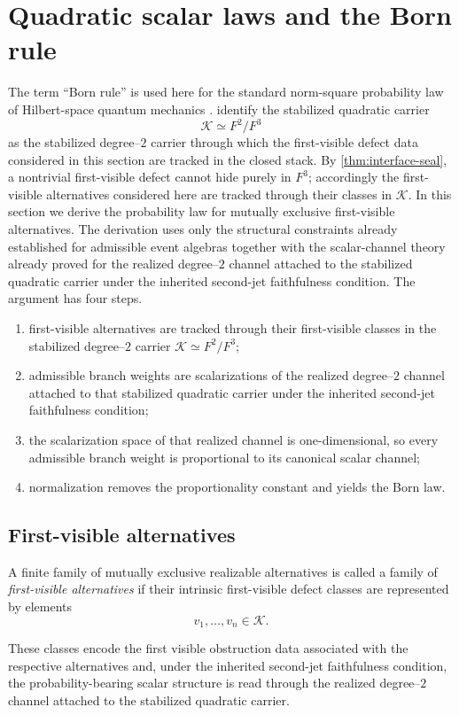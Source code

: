 \section{Quadratic scalar laws and the Born rule}
\label{sec:born-law}
The term ``Born rule'' is used here for the standard norm-square
probability law of Hilbert-space quantum mechanics \cite{VonNeumann1955}.
 identify the
stabilized quadratic carrier
\[
	\mathcal K \simeq F^2/F^3
\]
as the stabilized degree--\(2\) carrier through which the
first-visible defect data considered in this section are tracked in
the closed stack.  By \cref{thm:interface-seal}, a nontrivial
first-visible defect cannot hide purely in \(F^3\); accordingly the
first-visible alternatives considered here are tracked through their
classes in \(\mathcal K\).
In this section we derive the probability law for mutually exclusive
first-visible alternatives.  The derivation uses only the structural
constraints already established for admissible event algebras together
with the scalar-channel theory already proved for the realized
degree--\(2\) channel attached to the stabilized quadratic carrier
under the inherited second-jet faithfulness condition.
The argument has four steps.
\begin{enumerate}[label=\textup{(\roman*)}]
	\item
	      first-visible alternatives are tracked through their
	      first-visible classes in the stabilized degree--\(2\) carrier
	      \(\mathcal K\simeq F^2/F^3\);
	\item
	      admissible branch weights are scalarizations of the realized
	      degree--\(2\) channel attached to that stabilized quadratic carrier
	      under the inherited second-jet faithfulness condition;
	\item
	      the scalarization space of that realized channel is one-dimensional,
	      so every admissible branch weight is proportional to its canonical
	      scalar channel;
	\item
	      normalization removes the proportionality constant and yields the Born
	      law.
\end{enumerate}
\subsection{First-visible alternatives}
\begin{definition}
	A finite family of mutually exclusive realizable alternatives is called
	a family of \emph{first-visible alternatives} if their intrinsic
	first-visible defect classes are represented by elements
	\[
		v_1,\dots,v_n\in\mathcal K.
	\]
\end{definition}
These classes encode the first visible obstruction data associated with
the respective alternatives and, under the inherited second-jet
faithfulness condition, the probability-bearing scalar structure is
read through the realized degree--\(2\) channel attached to the
stabilized quadratic carrier.
